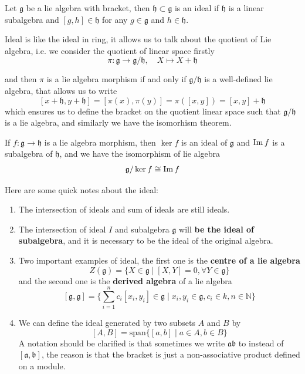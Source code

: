 \begin{definition}
    Let \(\mathfrak{g}\) be a lie algebra with bracket, then \(\mathfrak{h} \subset \mathfrak{g}\) is an ideal if \(\mathfrak{h}\) is a linear subalgebra and \([g,h] \in \mathfrak{h}\) for any \(g \in \mathfrak{g}\) and \(h \in \mathfrak{h}\).
\end{definition}

Ideal is like the ideal in ring, it allows us to talk about the quotient of Lie algebra, i.e. we consider the quotient of linear space firstly
\[\pi: \mathfrak{g} \to \mathfrak{g}/\mathfrak{h}, \quad X \mapsto X + \mathfrak{h}\]

and then \(\pi\) is a lie algebra morphism if and only if \(\mathfrak{g}/ \mathfrak{h}\) is a well-defined lie algebra, that allows us to write
\[[x + \mathfrak{h}, y + \mathfrak{h}] = [\pi(x),\pi(y)] = \pi([x,y]) = [x,y]+ \mathfrak{h}\]
which ensures us to define the bracket on the quotient linear space such that \(\mathfrak{g}/\mathfrak{h}\) is a lie algebra, and similarly we have the isomorhism theorem.

\begin{theorem}
    If \(f: \mathfrak{g} \to \mathfrak{h}\) is a lie algebra morphism, then \(\ker f\) is an ideal of \(\mathfrak{g}\) and \(\operatorname{Im} f\) is a subalgebra of \(\mathfrak{h}\), and we have the isomorphism of lie algebra
\[\mathfrak{g}/\ker f \cong \operatorname{Im} f\]
\end{theorem}

\begin{remark}
    Here are some quick notes about the ideal:
    \begin{enumerate}
        \item The intersection of ideals and sum of ideals are still ideals.
        \item The intersection of ideal \(I\) and subalgebra \(\mathfrak{g}\) will \textbf{be the ideal of subalgebra}, and it is necessary to be the ideal of the original algebra.
        \item Two important examples of ideal, the first one is the \textbf{centre of a lie algebra}
        \[Z(\mathfrak{g}) = \{X \in \mathfrak{g} \mid [X,Y] = 0, \forall Y \in \mathfrak{g}\}\]
        and the second one is the \textbf{derived algebra} of a lie algebra
        \[[\mathfrak{g}, \mathfrak{g}] = \{\sum_{i=1}^n c_i[x_i,y_i] \in \mathfrak{g} \mid x_i,y_i \in \mathfrak{g}, c_i \in k, n \in \mathbb{N}\}\]
        \item We can define the ideal generated by two subsets \(A\) and \(B\) by 
        \[[A,B] = \mathrm{span}\{[a,b] \mid a \in A, b \in B\}\]
        A notation should be clarified is that sometimes we write \(\mathfrak{a}\mathfrak{b}\) to instead of \([\mathfrak{a},\mathfrak{b}]\), the reason is that the bracket is just a non-associative product defined on a module.
    \end{enumerate}
\end{remark}

